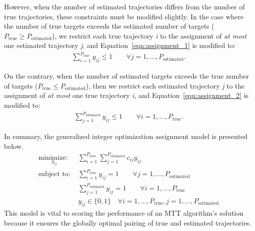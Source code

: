 However, when the number of estimated trajectories differs from the number of true trajectories, these constraints must be modified slightly. In the case where the number of true targets exceeds the estimated number of targets ($P_{\text{true}}\geq P_{\text{estimated}}$), we restrict each true trajectory \textit{i} to the assignment of \textit{at most} one estimated trajectory \textit{j}, and Equation~\ref{eqn:assignment_1} is modified to:
\begin{align*}
\sum_{i=1}^{P_{\text{true}}} y_{ij} \leq 1 \qquad \forall  j = 1,...,P_{\text{estimated}}.
\end{align*}

On the contrary, when the number of estimated targets exceeds the true number of targets ($P_{\text{true}}\leq P_{\text{estimated}}$), then we restrict each estimated trajectory \textit{j} to the assignment of \textit{at most} one true trajectory \textit{i}, and Equation~\ref{eqn:assignment_2} is modified to:
\begin{align*}
\sum_{j=1}^{P_{\text{estimated}}} y_{ij} \leq 1 \qquad \forall i = 1,...,P_{\text{true}}.
\end{align*}

In summary, the generalized integer optimization assignment model is presented below.  
\begin{align*}
\underset{y_{ij}}{\text{minimize: }} & \sum_{i=1}^{P_{\text{true}}} \sum_{j=1}^{P_{\text{estimated}}} c_{ij}y_{ij}\\
\text{subject to: }	& \sum_{i=1}^{P_{\text{true}}} y_{ij} = 1 \qquad \forall j = 1,...,P_{\text{estimated}} \nonumber \\
				& \sum_{j=1}^{P_{\text{estimated}}} y_{ij} = 1 \qquad \forall i = 1,...,P_{\text{true}} \nonumber \\
				& y_{ij} \in \{0,1\} \quad \forall i = 1,...,P_{\text{true}},j = 1,...,P_{\text{estimated}} \nonumber
\end{align*}
This model is vital to scoring the performance of an MTT algorithm's solution because it ensures the globally optimal pairing of true and estimated trajectories.


